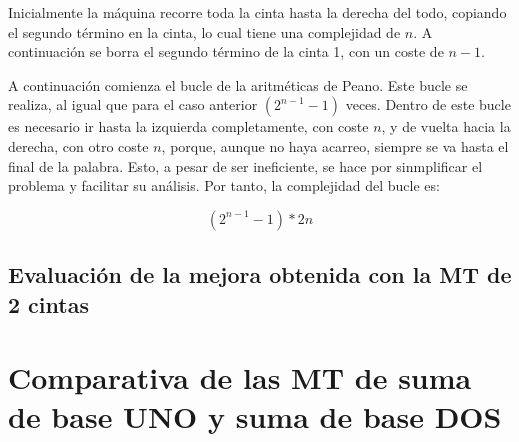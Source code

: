 \documentclass{uc3mpracticas}
\begin{document}
  \vspace{2mm}

  Inicialmente la máquina recorre toda la cinta hasta la derecha del todo, copiando el segundo término en la cinta, lo cual tiene una complejidad de $n$. A continuación se borra el segundo término de la cinta 1, con un coste de $n-1$.

  \vspace{2mm}

  A continuación comienza el bucle de la aritméticas de Peano. Este bucle se realiza, al igual que para el caso anterior $ (2^{n-1} -1) $ veces. Dentro de este bucle es necesario ir hasta la izquierda completamente, con coste $n$, y de vuelta hacia la derecha, con otro coste $n$, porque, aunque no haya acarreo, siempre se va hasta el final de la palabra. Esto, a pesar de ser ineficiente, se hace por sinmplificar el problema y facilitar su análisis. Por tanto, la complejidad del bucle es:

  $$ (2^{n-1} -1)*2n $$







  \subsection{Evaluación de la mejora obtenida con la MT de 2 cintas}







  \clearpage

  \section{Comparativa de las MT de suma de base UNO y suma de base DOS}
\end{document}
